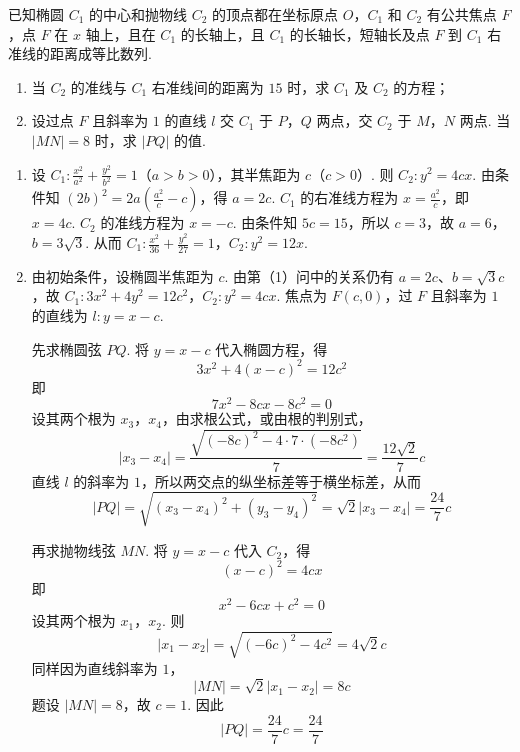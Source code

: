 \begin{problem}
已知椭圆 \(C_1\) 的中心和抛物线 \(C_2\) 的顶点都在坐标原点 \(O\)，\(C_1\) 和 \(C_2\) 有公共焦点 \(F\)，点 \(F\) 在 \(x\) 轴上，且在 \(C_1\) 的长轴上，且 \(C_1\) 的长轴长，短轴长及点 \(F\) 到 \(C_1\) 右准线的距离成等比数列.

\begin{enumerate}
\item 当 \(C_2\) 的准线与 \(C_1\) 右准线间的距离为 \(15\) 时，求 \(C_1\) 及 \(C_2\) 的方程；

\item 设过点 \(F\) 且斜率为 \(1\) 的直线 \(l\) 交 \(C_1\) 于 \(P\)，\(Q\) 两点，交 \(C_2\) 于 \(M\)，\(N\) 两点. 当 \(|MN|=8\) 时，求 \(|PQ|\) 的值.
\end{enumerate}
\end{problem}

\begin{solution}
\begin{enumerate}
\item 设 \(C_1:\frac{x^2}{a^2}+\frac{y^2}{b^2}=1\)（\(a>b>0\)），其半焦距为 \(c\)（\(c>0\)）. 则 \(C_2:y^2=4cx\). 由条件知 \((2b)^2=2a\left(\frac{a^2}{c}-c\right)\)，得 \(a=2c\). \(C_1\) 的右准线方程为 \(x=\frac{a^2}{c}\)，即 \(x=4c\). \(C_2\) 的准线方程为 \(x=-c\). 由条件知 \(5c=15\)，所以 \(c=3\)，故 \(a=6\)，\(b=3\sqrt{3}\). 从而 \(C_1:\frac{x^2}{36}+\frac{y^2}{27}=1\)，\(C_2:y^2=12x\).

\item 由初始条件，设椭圆半焦距为 \(c\). 由第（1）问中的关系仍有 \(a=2c\)、\(b=\sqrt3c\)，故 \(C_1:3x^2+4y^2=12c^2\)，\(C_2:y^2=4cx\).
焦点为 \(F(c,0)\)，过 \(F\) 且斜率为 \(1\) 的直线为 \(l:y=x-c\).

先求椭圆弦 \(PQ\). 将 \(y=x-c\) 代入椭圆方程，得
\[
3x^2+4(x-c)^2=12c^2
\]
即
\[
7x^2-8cx-8c^2=0
\]
设其两个根为 \(x_3\)，\(x_4\)，由求根公式，或由根的判别式，
\[
|x_3-x_4|=\frac{\sqrt{(-8c)^2-4\cdot7\cdot(-8c^2)}}{7}
=\frac{12\sqrt2}{7}c
\]
直线 \(l\) 的斜率为 \(1\)，所以两交点的纵坐标差等于横坐标差，从而
\[
|PQ|=\sqrt{(x_3-x_4)^2+(y_3-y_4)^2}
=\sqrt2|x_3-x_4|=\frac{24}{7}c
\]

再求抛物线弦 \(MN\). 将 \(y=x-c\) 代入 \(C_2\)，得
\[
(x-c)^2=4cx
\]
即
\[
x^2-6cx+c^2=0
\]
设其两个根为 \(x_1\)，\(x_2\). 则
\[
|x_1-x_2|=\sqrt{(-6c)^2-4c^2}=4\sqrt2c
\]
同样因为直线斜率为 \(1\)，
\[
|MN|=\sqrt2|x_1-x_2|=8c
\]
题设 \(|MN|=8\)，故 \(c=1\). 因此
\[
|PQ|=\frac{24}{7}c=\boxed{\frac{24}{7}}
\]
\end{enumerate}
\end{solution}

